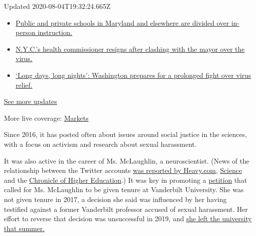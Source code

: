 Updated 2020-08-04T19:32:24.665Z

\begin{itemize}
\tightlist
\item
  \href{https://www.nytimes.com/2020/08/04/world/coronavirus-cases.html?action=click\&pgtype=Article\&state=default\&region=MAIN_CONTENT_1\&context=storylines_live_updates\#link-4825b93}{Public
  and private schools in Maryland and elsewhere are divided over
  in-person instruction.}
\item
  \href{https://www.nytimes.com/2020/08/04/world/coronavirus-cases.html?action=click\&pgtype=Article\&state=default\&region=MAIN_CONTENT_1\&context=storylines_live_updates\#link-4d1eafa8}{N.Y.C.'s
  health commissioner resigns after clashing with the mayor over the
  virus.}
\item
  \href{https://www.nytimes.com/2020/08/04/world/coronavirus-cases.html?action=click\&pgtype=Article\&state=default\&region=MAIN_CONTENT_1\&context=storylines_live_updates\#link-6b644638}{`Long
  days, long nights': Washington prepares for a prolonged fight over
  virus relief.}
\end{itemize}

\href{https://www.nytimes.com/2020/08/04/world/coronavirus-cases.html?action=click\&pgtype=Article\&state=default\&region=MAIN_CONTENT_1\&context=storylines_live_updates}{See
more updates}

More live coverage:
\href{https://www.nytimes.com/live/2020/08/04/business/stock-market-today-coronavirus?action=click\&pgtype=Article\&state=default\&region=MAIN_CONTENT_1\&context=storylines_live_updates}{Markets}

Since 2016, it has posted often about issues around social justice in
the sciences, with a focus on activism and research about sexual
harassment.

It was also active in the career of Ms. McLaughlin, a neuroscientist.
(News of the relationship between the Twitter accounts
\href{https://heavy.com/news/2020/08/sciencing_bi-bethann-mclaughlin-asu/}{was
reported by Heavy.com},
\href{https://www.sciencemag.org/news/2020/08/twitter-account-embattled-metoostem-founder-suspended}{Science}
and the
\href{https://www.chronicle.com/article/did-the-founder-of-metoostem-create-a-fake-online-persona-and-then-kill-it-off}{Chronicle
of Higher Education}.) It was key in promoting a
\href{https://www.change.org/p/vanderbilt-don-t-fire-prof-bethann-mclaughlin-for-standing-against-sexual-harassment}{petition}
that called for Ms. McLaughlin to be given tenure at Vanderbilt
University. She was not given tenure in 2017, a decision she said was
influenced by her having testified against a former Vanderbilt professor
accused of sexual harassment. Her effort to reverse that decision was
unsuccessful in 2019, and
\href{https://www.sciencemag.org/news/2019/07/metoostem-founder-out-vanderbilt}{she
left the university that summer.}

